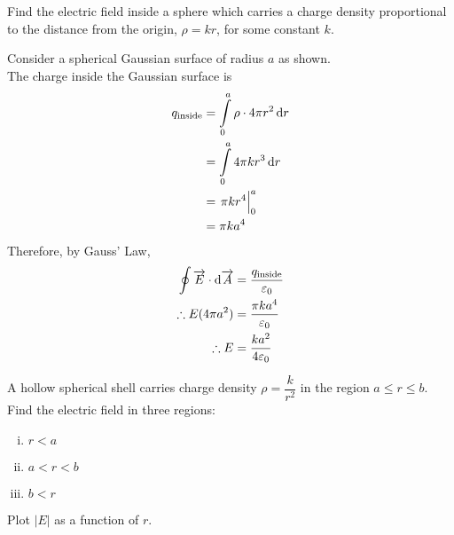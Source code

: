 \documentclass[fleqn, a4paper, 12pt, oneside]{amsart}
\theoremstyle{definition}
\theoremstyle{theorem}
\begin{document}
\begin{question}
	Find the electric field inside a sphere which carries a charge density proportional to the distance from the origin, $\rho = kr$, for some constant $k$.
\end{question}

\begin{solution}
	\begin{figure}[H]
	\end{figure}
	Consider a spherical Gaussian surface of radius $a$ as shown.\\
	The charge inside the Gaussian surface is
	\begin{align*}
		q_{\textnormal{inside}} &= \int\limits_{0}^{a} \rho \cdot 4 \pi r^2 \dif r\\
		&= \int\limits_{0}^{a} 4 \pi k r^3 \dif r\\
		&= \left. \pi k r^4 \right|_{0}^{a}\\
		&= \pi k a^4
	\end{align*}
	Therefore, by Gauss' Law,
	\begin{align*}
		\oint \overrightarrow{E} \cdot \dif \overrightarrow{A} &= \dfrac{q_{\textnormal{inside}}}{\varepsilon_0}\\
		\therefore E (4 \pi a^2) &= \dfrac{\pi k a^4}{\varepsilon_0}\\
		\therefore E &= \dfrac{k a^2}{4 \varepsilon_0}
	\end{align*}
\end{solution}

\begin{question}
	A hollow spherical shell carries charge density $\rho = \dfrac{k}{r^2}$ in the region $a \le r \le b$. Find the electric field in three regions:
	\begin{enumerate}[(i)]
		\item $r < a$
		\item $a < r < b$
		\item $b < r$
	\end{enumerate}
	Plot $|E|$ as a function of $r$.
\end{question}
\end{document}
